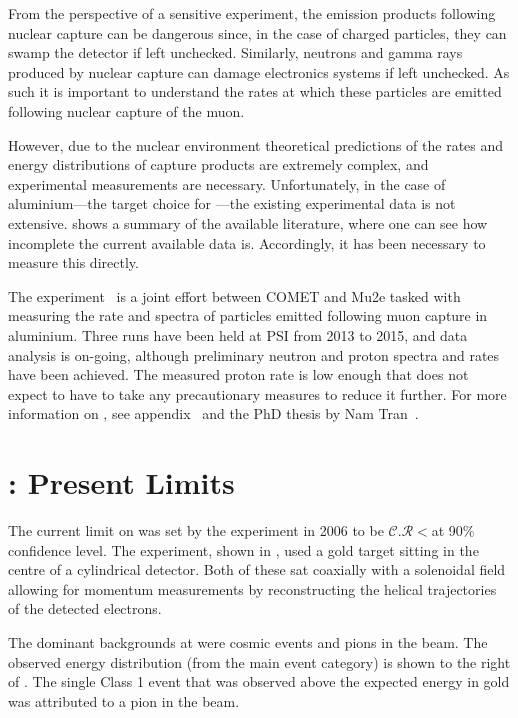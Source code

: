 From the perspective of a sensitive \mueconv experiment, the emission products following nuclear capture can be dangerous since, in the case of charged particles, they can swamp the detector if left unchecked.
Similarly, neutrons and gamma rays produced by nuclear capture can damage electronics systems if left unchecked.
As such it is important to understand the rates at which these particles are emitted following nuclear capture of the muon.

However, due to the nuclear environment theoretical predictions of the rates and energy distributions of capture products are extremely complex, and experimental measurements are necessary.
Unfortunately, in the case of aluminium---the target choice for \COMET---the existing experimental data is not extensive.
 shows a summary of the available literature, where one can see how incomplete the current available data is.
Accordingly, it has been necessary to measure this directly.

The \alcap experiment~\cite{AlcapProposal2012} is a joint effort between COMET and Mu2e tasked with measuring the rate and spectra of particles emitted following muon capture in aluminium.
Three runs have been held at \ac{PSI} from 2013 to 2015, and data analysis is on-going, although preliminary neutron and proton spectra and rates have been achieved.
The measured proton rate is low enough that \COMET does not expect to have to take any precautionary measures to reduce it further.
For more information on \alcap, see appendix~ and the PhD thesis by Nam Tran~\cite{NamThesis}.

\section{\sindrumII: Present Limits}
\FigMuecSindrumII
The current limit on \mueconv was set by the \sindrumII experiment in 2006 to be $\mathcal{C.R}<$\senseSindrum at 90\% confidence level.
The experiment, shown in , used a gold target sitting in the centre of a cylindrical detector.
Both of these sat coaxially with a solenoidal field allowing for momentum measurements by reconstructing the helical trajectories of the detected electrons.

The dominant backgrounds at \sindrumII were cosmic events and pions in the beam.  
The observed energy distribution (from the main event category) is shown to the right of .  
The single Class 1 event that was observed above the expected \mueconv energy in gold was attributed to a pion in the beam.
